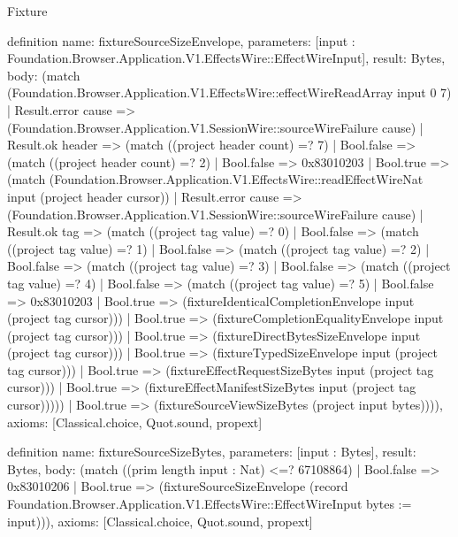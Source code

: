 \begin{lexlean}{Fixture}
\begin{semanticmodule}
definition{
  name: fixtureSourceSizeEnvelope,
  parameters: [input : Foundation.Browser.Application.V1.EffectsWire::EffectWireInput],
  result: Bytes,
  body: (match (Foundation.Browser.Application.V1.EffectsWire::effectWireReadArray input 0 7)
    | Result.error cause => (Foundation.Browser.Application.V1.SessionWire::sourceWireFailure cause)
    | Result.ok header => (match ((project header count) =? 7)
      | Bool.false => (match ((project header count) =? 2)
        | Bool.false => 0x83010203
        | Bool.true => (match (Foundation.Browser.Application.V1.EffectsWire::readEffectWireNat input (project header cursor))
          | Result.error cause => (Foundation.Browser.Application.V1.SessionWire::sourceWireFailure cause)
          | Result.ok tag => (match ((project tag value) =? 0)
            | Bool.false => (match ((project tag value) =? 1)
              | Bool.false => (match ((project tag value) =? 2)
                | Bool.false => (match ((project tag value) =? 3)
                  | Bool.false => (match ((project tag value) =? 4)
                    | Bool.false => (match ((project tag value) =? 5)
                      | Bool.false => 0x83010203
                      | Bool.true => (fixtureIdenticalCompletionEnvelope input (project tag cursor)))
                    | Bool.true => (fixtureCompletionEqualityEnvelope input (project tag cursor)))
                  | Bool.true => (fixtureDirectBytesSizeEnvelope input (project tag cursor)))
                | Bool.true => (fixtureTypedSizeEnvelope input (project tag cursor)))
              | Bool.true => (fixtureEffectRequestSizeBytes input (project tag cursor)))
            | Bool.true => (fixtureEffectManifestSizeBytes input (project tag cursor)))))
      | Bool.true => (fixtureSourceViewSizeBytes (project input bytes)))),
  axioms: [Classical.choice, Quot.sound, propext]
}

definition{
  name: fixtureSourceSizeBytes,
  parameters: [input : Bytes],
  result: Bytes,
  body: (match ((prim length input : Nat) <=? 67108864)
    | Bool.false => 0x83010206
    | Bool.true => (fixtureSourceSizeEnvelope (record Foundation.Browser.Application.V1.EffectsWire::EffectWireInput {bytes := input}))),
  axioms: [Classical.choice, Quot.sound, propext]
}
\end{semanticmodule}
\end{lexlean}
